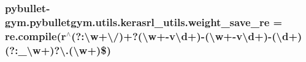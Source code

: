 \subsubsection[{\texorpdfstring{weight\+\_\+save\+\_\+re}{weight_save_re}}]{\setlength{\rightskip}{0pt plus 5cm}pybullet-\/gym.\+pybulletgym.\+utils.\+kerasrl\+\_\+utils.\+weight\+\_\+save\+\_\+re = re.\+compile(r\textquotesingle{}$^\wedge$(?\+:\textbackslash{}w+\textbackslash{}/)+?(\textbackslash{}w+-\/v\textbackslash{}d+)-\/(\textbackslash{}w+-\/v\textbackslash{}d+)-\/(\textbackslash{}d+)(?\+:\+\_\+\textbackslash{}w+)?\textbackslash{}.(\textbackslash{}w+)\$\textquotesingle{})}\hypertarget{namespacepybullet-gym_1_1pybulletgym_1_1utils_1_1kerasrl__utils_a2dc88ba5a7e631ef64f783b379061de7}{}\label{namespacepybullet-gym_1_1pybulletgym_1_1utils_1_1kerasrl__utils_a2dc88ba5a7e631ef64f783b379061de7}
